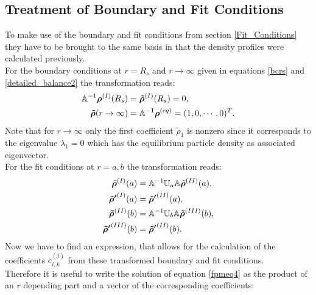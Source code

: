 \subsection{Treatment of Boundary and Fit Conditions}
\label{Treatment_of_Boundary_and_Fit_Conditions}
To make use of the boundary and fit conditions from section \ref{Fit_Conditions} they have to be brought to the same basis in that the density profiles were calculated previously. \\
For the boundary conditions at $r=R_s$ and $r \rightarrow \infty$ given in equations \eqref{bcrs} and \eqref{detailed_balance2} the transformation reads:
\begin{align}
    \mathbb{A}^{-1}\boldsymbol{\mathbf{\rho}}^{(I)}(R_s) &= \boldsymbol{\mathbf{\tilde{\rho}}}^{(I)}(R_s) = 0, \nonumber \\
    \boldsymbol{\mathbf{\tilde{\rho}}}(r \rightarrow \infty) &= \mathbb{A}^{-1} \boldsymbol{\mathbf{\rho}}^{(eq)} = (1,0,\cdots,0)^{T}.
\end{align}
Note that for $r\rightarrow \infty$ only the first coefficient $\tilde{\rho}_1$ is nonzero since it corresponds to the eigenvalue $\lambda_1=0$ which has the equilibrium particle density as associated eigenvector.\\
For the fit conditions at $r=a,b$ the transformation reads:
\begin{align}
    \boldsymbol{\mathbf{\tilde{\rho}}}^{(I)}(a) &= \mathbb{A}^{-1}\mathbb{U}_a\mathbb{A} \boldsymbol{\mathbf{\tilde{\rho}}}^{(II)}(a), \\ \nonumber
    \boldsymbol{\mathbf{\tilde{\rho} '}}^{(I)}(a) &= \boldsymbol{\mathbf{\tilde{\rho} '}}^{(II)}(a), \\ \nonumber
    \boldsymbol{\mathbf{\tilde{\rho}}}^{(II)}(b) &= \mathbb{A}^{-1}\mathbb{U}_b\mathbb{A} \boldsymbol{\mathbf{\tilde{\rho}}}^{(III)}(b), \\ \nonumber
    \boldsymbol{\mathbf{\tilde{\rho} '}}^{(III)}(b) &= \boldsymbol{\mathbf{\tilde{\rho} '}}^{(II)}(b).
\end{align}
Now we have to find an expression, that allows for the calculation of the coefficients $c_{i,k}^{(j)}$ from these transformed boundary and fit conditions.\\
Therefore it is useful to write the solution of equation \eqref{fpmeq4} as the product of an $r$ depending part and a vector of the corresponding coefficients:
